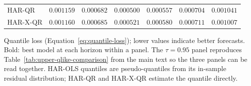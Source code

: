 \begin{table}[htbp]
\begin{tabular}{lcccccc}
HAR-QR           & $\mathbf{0.001159}$ & $\mathbf{0.000682}$ & $\mathbf{0.000500}$ & $\mathbf{0.000557}$ & $0.000704$ & $0.001041$ \\
HAR-X-QR         & $0.001160$ & $0.000685$ & $0.000521$ & $0.000580$ & $0.000711$ & $0.001007$ \\
\bottomrule
\end{tabular}
\par\smallskip
{\footnotesize Quantile loss (Equation~\eqref{eq:quantile-loss}); lower values indicate better forecasts. Bold: best model at each horizon within a panel. The $\tau = 0.95$ panel reproduces Table~\ref{tab:upper-qlike-comparison} from the main text so the three panels can be read together. HAR-OLS quantiles are pseudo-quantiles from its in-sample residual distribution; HAR-QR and HAR-X-QR estimate the quantile directly.}
\end{table}
